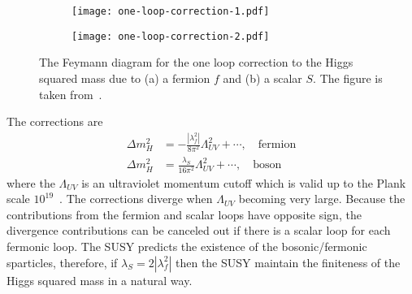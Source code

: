 \begin{figure}[htbp]
    \begin{center}
        \begin{subfigure}[b]{0.48\textwidth}
            \begin{center}
                \texttt{[image: one-loop-correction-1.pdf]}
                \caption{}
            \end{center}
        \end{subfigure}%
        \begin{subfigure}[b]{0.48\textwidth}
            \begin{center}
                \texttt{[image: one-loop-correction-2.pdf]}
                \caption{}
            \end{center}
        \end{subfigure}
    \end{center}
    \caption{The Feymann diagram for the one loop correction to the Higgs squared mass due to (a) a fermion $f$ and (b) a scalar $S$.
    The figure is taken from~\cite{Martin:1997ns}.}
    \label{fig:susy_one_loop_corrections}
\end{figure}

The corrections are
%
\begin{align}
    \Delta m_{H}^{2} &= - \frac{|\lambda_{f}^{2}|}{8\pi^{2}} \Lambda_{UV}^{2} + \cdots, \quad \mathrm{fermion}\\
    \Delta m_{H}^{2} &= \frac{\lambda_{S}}{16\pi^{2}} \Lambda_{UV}^{2} + \cdots, \quad \mathrm{boson}
\end{align}
%
where the $\Lambda_{UV}$ is an ultraviolet momentum cutoff which is valid up to the Plank scale $10^{19}$~{\GeV}.
The corrections diverge when $\Lambda_{UV}$ becoming very large.
Because the contributions from the fermion and scalar loops have opposite sign, the divergence contributions can be canceled out if there is a scalar loop for each fermonic loop.
The SUSY predicts the existence of the bosonic/fermonic sparticles, therefore, if $\lambda_{S} = 2 |\lambda_{f}^{2}|$ then the SUSY maintain the finiteness of the Higgs squared mass in a natural way.

